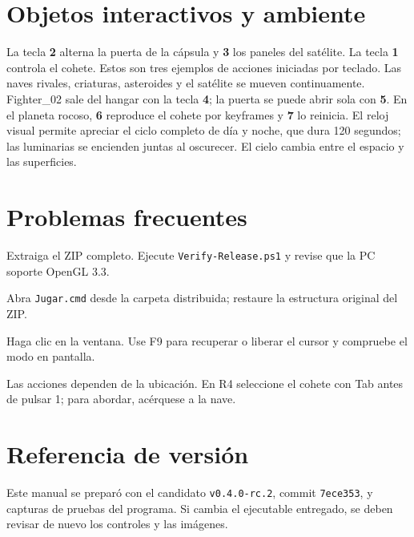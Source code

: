 \documentclass[11pt,letterpaper]{article}
\begin{document}
\section{Objetos interactivos y ambiente}
La tecla \textbf{2} alterna la puerta de la cápsula y \textbf{3} los paneles del satélite. La tecla \textbf{1} controla el cohete. Estos son tres ejemplos de acciones iniciadas por teclado. Las naves rivales, criaturas, asteroides y el satélite se mueven continuamente. Fighter\_02 sale del hangar con la tecla \textbf{4}; la puerta se puede abrir sola con \textbf{5}. En el planeta rocoso, \textbf{6} reproduce el cohete por keyframes y \textbf{7} lo reinicia. El reloj visual permite apreciar el ciclo completo de día y noche, que dura 120 segundos; las luminarias se encienden juntas al oscurecer. El cielo cambia entre el espacio y las superficies.

\section{Problemas frecuentes}
\begin{description}[leftmargin=3cm,style=nextline]
\item[No abre el juego] Extraiga el ZIP completo. Ejecute \texttt{Verify-Release.ps1} y revise que la PC soporte OpenGL 3.3.
\item[No aparecen modelos o texturas] Abra \texttt{Jugar.cmd} desde la carpeta distribuida; restaure la estructura original del ZIP.
\item[No responden las teclas] Haga clic en la ventana. Use F9 para recuperar o liberar el cursor y compruebe el modo en pantalla.
\item[Una acción no se activa] Las acciones dependen de la ubicación. En R4 seleccione el cohete con Tab antes de pulsar 1; para abordar, acérquese a la nave.
\end{description}

\section*{Referencia de versión}
Este manual se preparó con el candidato \texttt{v0.4.0-rc.2}, commit \texttt{7ece353}, y capturas de pruebas del programa. Si cambia el ejecutable entregado, se deben revisar de nuevo los controles y las imágenes.
\end{document}
